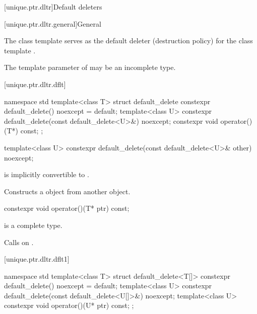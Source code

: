 [unique.ptr.dltr]{Default deleters}

[unique.ptr.dltr.general]{General}

\pnum
The class template  serves as the default deleter (destruction policy)
for the class template .

\pnum
The template parameter  of  may be
an incomplete type.

[unique.ptr.dltr.dflt]{}

\begin{codeblock}
namespace std {
  template<class T> struct default_delete {
    constexpr default_delete() noexcept = default;
    template<class U> constexpr default_delete(const default_delete<U>&) noexcept;
    constexpr void operator()(T*) const;
  };
}
\end{codeblock}

%
\begin{itemdecl}
template<class U> constexpr default_delete(const default_delete<U>& other) noexcept;
\end{itemdecl}

\begin{itemdescr}
\pnum
\constraints
{} is implicitly convertible to .

\pnum
\effects
Constructs a  object
from another  object.
\end{itemdescr}

%
\begin{itemdecl}
constexpr void operator()(T* ptr) const;
\end{itemdecl}

\begin{itemdescr}
\pnum
\mandates
{} is a complete type.

\pnum
\effects
Calls  on .
\end{itemdescr}

[unique.ptr.dltr.dflt1]{}

\begin{codeblock}
namespace std {
  template<class T> struct default_delete<T[]> {
    constexpr default_delete() noexcept = default;
    template<class U> constexpr default_delete(const default_delete<U[]>&) noexcept;
    template<class U> constexpr void operator()(U* ptr) const;
  };
}
\end{codeblock}

